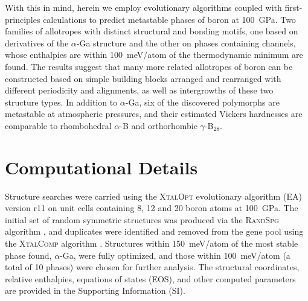 \documentclass[reprint,aps,prl,twocolumn,letterpaper]{revtex4-2}
\begin{document}
With this in mind, herein we employ evolutionary algorithms coupled with first-principles calculations to predict metastable phases of boron at 100~GPa. Two families of allotropes with distinct structural and bonding motifs, one based on derivatives of the $\alpha$-Ga structure and the other on phases containing channels, whose enthalpies are within 100~meV/atom of the thermodynamic minimum are found. The results suggest that many more related allotropes of boron can be constructed based on simple building blocks arranged and rearranged with different periodicity and alignments, as well as intergrowths of these two structure types. In addition to $\alpha$-Ga, six of the discovered polymorphs are metastable at atmospheric pressures, and their estimated Vickers hardnesses are comparable to rhombohedral $\alpha$-B and orthorhombic $\gamma$-B$_{28}$\cite{Veprek:2011,Solozhenko:2008,Zhang:2018}.



\section{Computational Details}

Structure searches were carried using the \textsc{XtalOpt} evolutionary algorithm (EA) version r11 \cite{Lonie:2011,Avery:2018} on unit cells containing 8, 12 and 20 boron atoms at 100~GPa. The initial set of random symmetric structures was produced via the \textsc{RandSpg} algorithm \cite{Avery:2017}, and  duplicates were identified and removed from the gene pool using the \textsc{XtalComp} algorithm \cite{Lonie:2012}. Structures within 150~meV/atom of the most stable phase found, $\alpha$-Ga, were fully optimized, and those within 100~meV/atom (a total of 10 phases) were chosen for further analysis. The structural coordinates, relative enthalpies, equations of states (EOS), and other computed parameters are provided in the Supporting Information (SI). 
\end{document}
